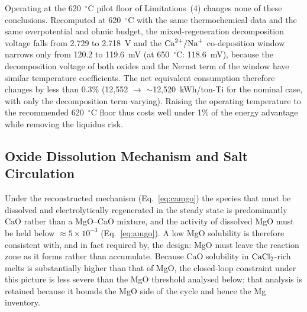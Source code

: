 \documentclass[11pt]{article}
\begin{document}
Operating at the 620~$^{\circ}$C pilot floor of Limitations~(4) changes none of these conclusions. Recomputed at 620~$^{\circ}$C with the same thermochemical data and the same overpotential and ohmic budget, the mixed-regeneration decomposition voltage falls from 2.729 to 2.718~V and the $\ce{Ca^{2+}/Na+}$ co-deposition window narrows only from 120.2 to 119.6~mV (at 650~$^{\circ}$C: 118.6~mV), because the decomposition voltage of both oxides and the Nernst term of the window have similar temperature coefficients. The net equivalent consumption therefore changes by less than 0.3\% (12{,}552 $\to$ $\sim$12{,}520~kWh/ton-Ti for the nominal case, with only the decomposition term varying). Raising the operating temperature to the recommended 620~$^{\circ}$C floor thus costs well under 1\% of the energy advantage while removing the liquidus risk.

\subsection*{Oxide Dissolution Mechanism and Salt Circulation}
\label{subsec:dissolution}

Under the reconstructed mechanism (Eq.~\ref{eq:camgo}) the species that must be dissolved and electrolytically regenerated in the steady state is predominantly CaO rather than a MgO--CaO mixture, and the activity of dissolved MgO must be held below $\approx 5\times10^{-3}$ (Eq.~\ref{eq:amgo}). A low MgO solubility is therefore consistent with, and in fact required by, the design: MgO must leave the reaction zone as it forms rather than accumulate. Because CaO solubility in $\ce{CaCl2}$-rich melts is substantially higher than that of MgO, the closed-loop constraint under this picture is less severe than the MgO threshold analysed below; that analysis is retained because it bounds the MgO side of the cycle and hence the Mg inventory.
\end{document}
